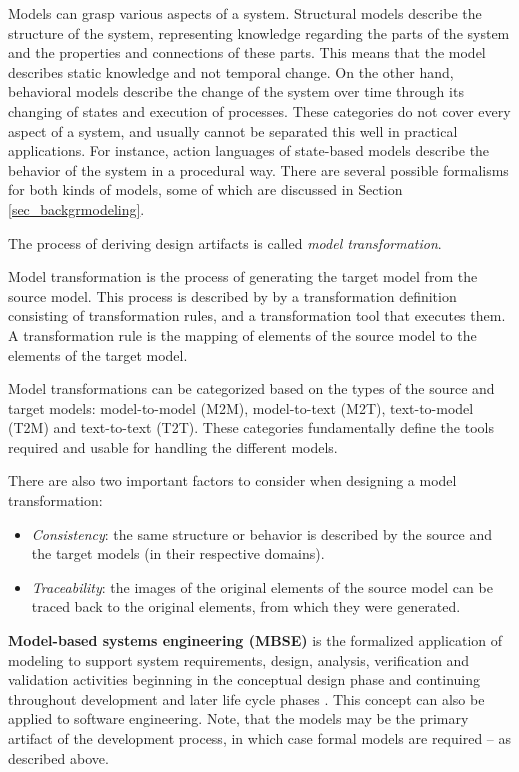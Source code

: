 Models can grasp various aspects of a system. Structural models describe the structure of the system, representing knowledge regarding the parts of the system and the properties and connections of these parts. This means that the model describes static knowledge and not temporal change. On the other hand, behavioral models describe the change of the system over time through its changing of states and execution of processes. These categories do not cover every aspect of a system, and usually cannot be separated this well in practical applications. For instance, action languages of state-based models describe the behavior of the system in a procedural way. There are several possible formalisms for both kinds of models, some of which are discussed in Section \ref{sec_backgrmodeling}.

The process of deriving design artifacts is called \textit{model transformation}.
\begin{definition}
	Model transformation is the process of generating the target model from the source model. This process is described by by a transformation definition consisting of transformation rules, and a transformation tool that executes them. A transformation rule is the mapping of elements of the source model to the elements of the target model. \cite{ModelTransformation}
\end{definition}

Model transformations can be categorized based on the types of the source and target models: model-to-model (M2M), model-to-text (M2T), text-to-model (T2M) and text-to-text (T2T). These categories fundamentally define the tools required and usable for handling the different models.

There are also two important factors to consider when designing a model transformation: 
\begin{itemize}
	\item \textit{Consistency}: the same structure or behavior is described by the source and the target models (in their respective domains).
	\item \textit{Traceability}: the images of the original elements of the source model can be traced back to the original elements, from which they were generated.
\end{itemize}

\textbf{Model-based systems engineering (MBSE)} is the formalized application of modeling to support system requirements, design, analysis, verification and validation activities beginning in the conceptual design phase and continuing throughout development and later life cycle phases \cite{mbse}. This concept can also be applied to software engineering. Note, that the models may be the primary artifact of the development process, in which case formal models are required -- as described above.

